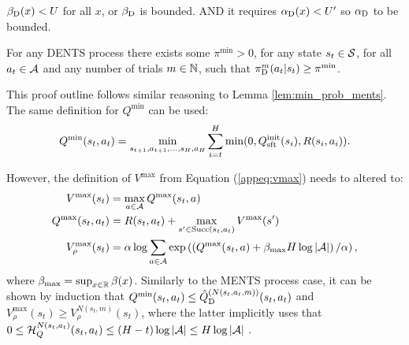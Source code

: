          ${\beta_{{\textnormal{D}}}}(x) < U$ for all $x$, or ${\beta_{{\textnormal{D}}}}$ is bounded. AND it requires ${\alpha_{{\textnormal{D}}}}(x) < U'$ so ${\alpha_{{\textnormal{D}}}}$ to be bounded.
        \begin{lemma} \label{lem:min_prob_dents}
            For any DENTS process there exists some $\pi^{\min}>0$, for any state $s_t\in\mathcal{S}$, for all $a_t\in\mathcal{A}$ and any number of trials $m\in\mathbb{N}$, such that ${\pi^{m}_{{\textnormal{D}}}}(a_t|s_t)\geq\pi^{\min}$.
        \end{lemma}
        \begin{proofoutline}
            This proof outline follows similar reasoning to Lemma \ref{lem:min_prob_ments}. The same definition for $Q^{\min}$ can be used:
            \begin{align}
                Q^{\min}(s_t,a_t) = \min_{s_{t+1},a_{t+1},...,s_H,a_H} \sum_{i=t}^H \min(0, Q^{\text{init}}_{{\textnormal{sft}}}(s_i), R(s_i,a_i)).
            \end{align}

            However, the definition of $V^{\max}$ from Equation (\ref{appeq:vmax}) needs to altered to:
            \begin{align}
                V^{\max}(s_t) &= \max_{a\in\mathcal{A}} Q^{\max}(s_t,a) \\
                Q^{\max}(s_t,a_t) &= R(s_t,a_t) + \max_{s'\in{\textnormal{Succ}(s_t,a_t)}} V^{\max}(s') \\
                V_\rho^{\max}(s_t) &= \alpha \log \sum_{a\in\mathcal{A}} \exp \left(\left(Q^{\max}(s_t,a) + \beta_{\max}H\log|\mathcal{A}| \right)/\alpha\right), 
            \end{align}
            where $\beta_{\max}=\sup_{x\in\mathbb{R}}\beta(x)$. Similarly to the MENTS process case, it can be shown by induction that $Q^{\min}(s_t,a_t)\leq {\hat{Q}^{(N(s_t,a_t,m))}_{{\textnormal{D}}}}(s_t,a_t)$ and $V_\rho^{\max}(s_t)\geq V_{\rho}^{N(s_t,m)}(s_t)$, where the latter implicitly uses that $0 \leq \mathcal{H}_Q^{N(s_t,a_t)}(s_t,a_t) \leq (H-t)\log|\mathcal{A}| \leq H\log|\mathcal{A}|$ . 
            

\end{proofoutline}
